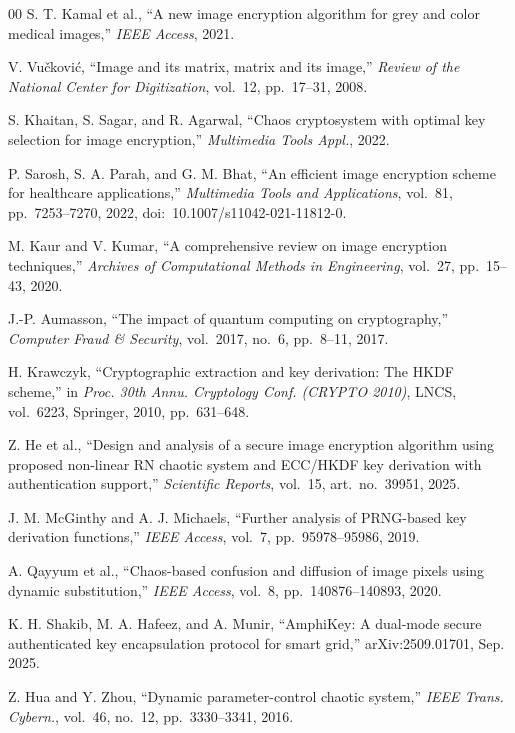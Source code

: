 \documentclass[conference]{IEEEtran}
\begin{document}
\begin{thebibliography}{00}
	S. T. Kamal et al., ``A new image encryption algorithm for grey and color medical images,'' \textit{IEEE Access}, 2021.

	V. Vu\v{c}kovi\'{c}, ``Image and its matrix, matrix and its image,'' \textit{Review of the National Center for Digitization}, vol.~12, pp.~17--31, 2008.

	S. Khaitan, S. Sagar, and R. Agarwal, ``Chaos cryptosystem with optimal key selection for image encryption,'' \textit{Multimedia Tools Appl.}, 2022.

	P. Sarosh, S. A. Parah, and G. M. Bhat, ``An efficient image encryption scheme for healthcare applications,'' \textit{Multimedia Tools and Applications}, vol.~81, pp.~7253--7270, 2022, doi:~10.1007/s11042-021-11812-0.

	M. Kaur and V. Kumar, ``A comprehensive review on image encryption techniques,'' \textit{Archives of Computational Methods in Engineering}, vol.~27, pp.~15--43, 2020.

	J.-P. Aumasson, ``The impact of quantum computing on cryptography,'' \textit{Computer Fraud \& Security}, vol.~2017, no.~6, pp.~8--11, 2017.

	H. Krawczyk, ``Cryptographic extraction and key derivation: The HKDF scheme,'' in \textit{Proc. 30th Annu. Cryptology Conf. (CRYPTO 2010)}, LNCS, vol.~6223, Springer, 2010, pp.~631--648.

	Z. He et al., ``Design and analysis of a secure image encryption algorithm using proposed non-linear RN chaotic system and ECC/HKDF key derivation with authentication support,'' \textit{Scientific Reports}, vol.~15, art.~no.~39951, 2025.

	J. M. McGinthy and A. J. Michaels, ``Further analysis of PRNG-based key derivation functions,'' \textit{IEEE Access}, vol.~7, pp.~95978--95986, 2019.

	A. Qayyum et al., ``Chaos-based confusion and diffusion of image pixels using dynamic substitution,'' \textit{IEEE Access}, vol.~8, pp.~140876--140893, 2020.

	K. H. Shakib, M. A. Hafeez, and A. Munir, ``AmphiKey: A dual-mode secure authenticated key encapsulation protocol for smart grid,'' arXiv:2509.01701, Sep. 2025.

	Z. Hua and Y. Zhou, ``Dynamic parameter-control chaotic system,'' \textit{IEEE Trans. Cybern.}, vol.~46, no.~12, pp.~3330--3341, 2016.


\end{thebibliography}
\end{document}
